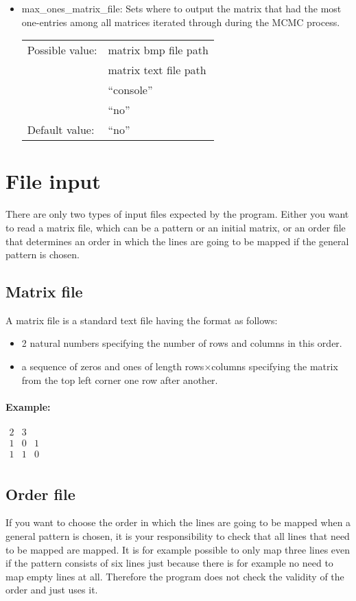 \begin{itemize}
\item max\_ones\_matrix\_file: Sets where to output the matrix that had the most one-entries among all matrices iterated through during the MCMC process.

\begin{tabular}{ll}
Possible value: & matrix bmp file path \\
& matrix text file path \\
& ``console'' \\
& ``no'' \\
Default value: & ``no''
\end{tabular}

\end{itemize}
\section{File input}
There are only two types of input files expected by the program. Either you want to read a matrix file, which can be a pattern or an initial matrix, or an order file that determines an order in which the lines are going to be mapped if the general pattern is chosen.

\subsection{Matrix file}
A matrix file is a standard text file having the format as follows:
\begin{itemize}
\item 2 natural numbers specifying the number of rows and columns in this order.
\item a sequence of zeros and ones of length rows$\times$columns specifying the matrix from the top left corner one row after another.
\end{itemize}
\paragraph{Example:}
$\begin{array}{ccc}
2 & 3 & \\
1 & 0 & 1 \\
1 & 1 & 0 \\
\end{array}$

\subsection{Order file}
If you want to choose the order in which the lines are going to be mapped when a general pattern is chosen, it is your responsibility to check that all lines that need to be mapped are mapped. It is for example possible to only map three lines even if the pattern consists of six lines just because there is for example no need to map empty lines at all. Therefore the program does not check the validity of the order and just uses it.

